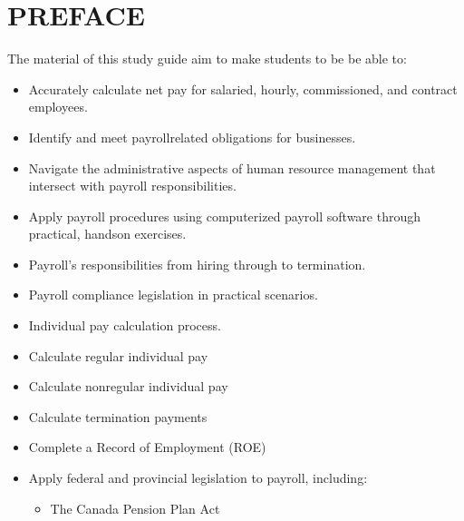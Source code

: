 \documentclass[letterpaper,10pt,english]{sphinxmanual}
\begin{document}
\chapter{PREFACE}
\label{\detokenize{preface:preface}}\label{\detokenize{preface::doc}}
\sphinxAtStartPar
The material of this study guide aim to make students to be be able to:
\begin{itemize}
\item {} 
\sphinxAtStartPar
Accurately calculate net pay for salaried, hourly, commissioned, and contract employees.

\item {} 
\sphinxAtStartPar
Identify and meet payroll\sphinxhyphen{}related obligations for businesses.

\item {} 
\sphinxAtStartPar
Navigate the administrative aspects of human resource management that intersect with payroll responsibilities.

\item {} 
\sphinxAtStartPar
Apply payroll procedures using computerized payroll software through practical, hands\sphinxhyphen{}on exercises.

\item {} 
\sphinxAtStartPar
Payroll’s responsibilities from hiring through to termination.

\item {} 
\sphinxAtStartPar
Payroll compliance legislation in practical scenarios.

\item {} 
\sphinxAtStartPar
Individual pay calculation process.

\item {} 
\sphinxAtStartPar
Calculate regular individual pay

\item {} 
\sphinxAtStartPar
Calculate non\sphinxhyphen{}regular individual pay

\item {} 
\sphinxAtStartPar
Calculate termination payments

\item {} 
\sphinxAtStartPar
Complete a Record of Employment (ROE)

\item {} 
\sphinxAtStartPar
Apply federal and provincial legislation to payroll, including:
\begin{itemize}
\item {} 
\sphinxAtStartPar
The Canada Pension Plan Act


\end{itemize}
\end{itemize}
\end{document}
